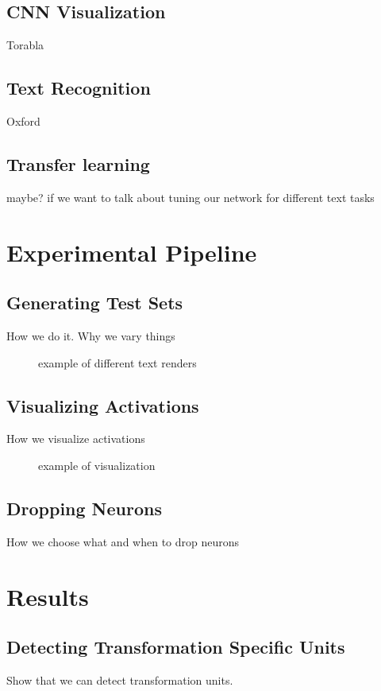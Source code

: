 \documentclass[10pt,twocolumn,letterpaper]{article}
\begin{document}
\subsection{CNN Visualization}

Torabla

\subsection{Text Recognition}

Oxford

\subsection{Transfer learning}

maybe? if we want to talk about tuning our network for different text tasks

\section{Experimental Pipeline}
\subsection{Generating Test Sets}
How we do it. Why we vary things

\begin{figure}
\caption{example of different text renders}
\label{fig:text}
\end{figure}

\subsection{Visualizing Activations}
How we visualize activations
\begin{figure}
\caption{example of visualization}
\label{fig:vis}
\end{figure}

\subsection{Dropping Neurons}
How we choose what and when to drop neurons

\section{Results}

\subsection{Detecting Transformation Specific Units}
Show that we can detect transformation units.
\end{document}
